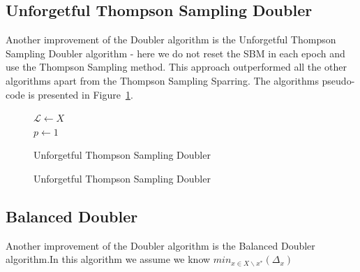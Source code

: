 \documentclass{llncs}
\begin{document}
	\subsection{Unforgetful Thompson Sampling Doubler}
		Another improvement of the Doubler algorithm is the Unforgetful Thompson Sampling Doubler algorithm - here we do not reset the SBM in each epoch and use the Thompson Sampling method. This approach outperformed all the other algorithms apart from the Thompson Sampling Sparring.
		The algorithms pseudo-code is presented in Figure~\ref{algo_uts_doubler}.

		\begin{figure}[h]
	\IncMargin{1em}
		\begin{algorithm}[H]
		\BlankLine
		$\mathcal{L} \leftarrow X$\\
		$p\leftarrow 1$\\
			\caption{Unforgetful Thompson Sampling Doubler}
		\end{algorithm}
		\caption{Unforgetful Thompson Sampling Doubler}\label{algo_uts_doubler}
	\end{figure}
		
		\newpage	
	\subsection{Balanced Doubler}
		Another improvement of the Doubler algorithm is the Balanced Doubler algorithm.In this algorithm we assume we know $min_{x\in X \backslash x^*}(\Delta_x)$
		
\end{document}
